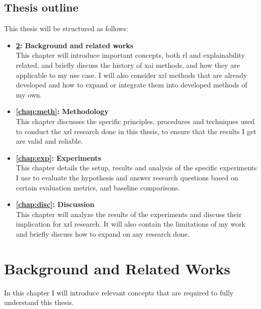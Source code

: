 \documentclass[UKenglish]{uiomasterthesis}
\begin{document}
\section{Thesis outline}
This thesis will be structured as follows:
\begin{itemize}

    \item \textbf{\cref{chap:background}: Background and related works}\\
        This chapter will introduce important concepts, both \ac{rl} and explainability related, and briefly discuss the history of \ac{xai} methods, and how they are applicable to my use case. I will also consider \ac{xrl} methods that are already developed and how to expand or integrate them into developed methods of my own.

    \item \textbf{\cref{chap:meth}: Methodology}\\
        This chapter discusses the specific principles, procedures and techniques used to conduct the \ac{xrl} research done in this thesis, to ensure that the results I get are valid and reliable.

    \item \textbf{\cref{chap:exp}: Experiments}\\
        This chapter details the setup, results and analysis of the specific experiments I use to evaluate the hypothesis and answer research questions based on certain evaluation metrics, and baseline comparisons.

    \item \textbf{\cref{chap:disc}: Discussion}\\
        This chapter will analyze the results of the experiments and discuss their implication for \ac{xrl} research. It will also contain the limitations of my work and briefly discuss how to expand on any research done.
\end{itemize}


\chapter{Background and Related Works}
\label{chap:background}
In this chapter I will introduce relevant concepts that are required to fully understand this thesis.
\end{document}
